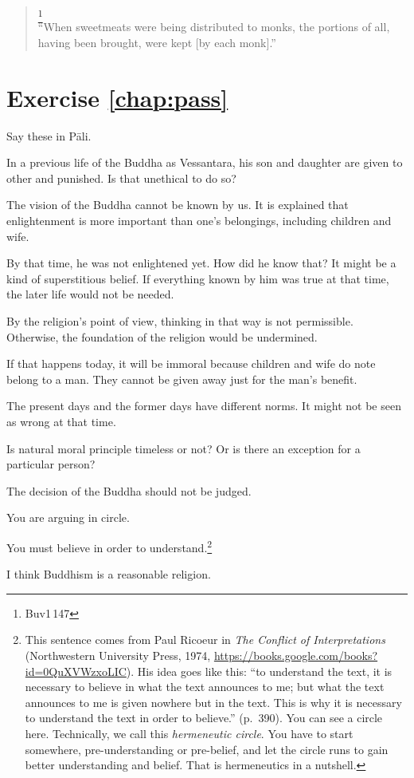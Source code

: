 \begin{quote}
\footnote{Buv1\,147}\\
``When sweetmeats were being distributed to monks, the portions of all, having been brought, were kept [by each monk].''\\
\end{quote}

\section*{Exercise \ref{chap:pass}}
Say these in P\=ali.
\begin{compactenum}
\item In a previous life of the Buddha as Vessantara, his son and daughter are given to other and punished. Is that unethical to do so?
\item The vision of the Buddha cannot be known by us. It is explained that enlightenment is more important than one's belongings, including children and wife.
\item By that time, he was not enlightened yet. How did he know that? It might be a kind of superstitious belief. If everything known by him was true at that time, the later life would not be needed.
\item By the religion's point of view, thinking in that way is not permissible. Otherwise, the foundation of the religion would be undermined.
\item If that happens today, it will be immoral because children and wife do note belong to a man. They cannot be given away just for the man's benefit.
\item The present days and the former days have different norms. It might not be seen as wrong at that time.
\item Is natural moral principle timeless or not? Or is there an exception for a particular person?
\item The decision of the Buddha should not be judged.
\item You are arguing in circle.
\item You must believe in order to understand.\footnote{This sentence comes from Paul Ricoeur in \emph{The Conflict of Interpretations} (Northwestern University Press, 1974, \url{https://books.google.com/books?id=0QuXVWzxoLIC}). His idea goes like this: ``to understand the text, it is necessary to believe in what the text announces to me; but what the text announces to me is given nowhere but in the text. This is why it is necessary to understand the text in order to believe.'' (p.~390). You can see a circle here. Technically, we call this \emph{hermeneutic circle}. You have to start somewhere, pre-understanding or pre-belief, and let the circle runs to gain better understanding and belief. That is hermeneutics in a nutshell.}
\item I think Buddhism is a reasonable religion.
\end{compactenum}
